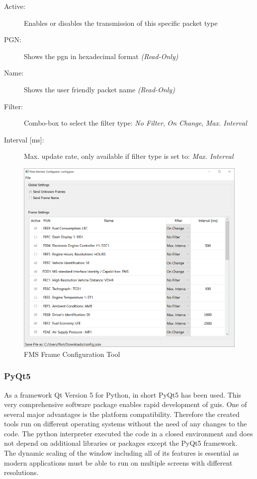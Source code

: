 \begin{description}
  \item[Active:] Enables or disables the transmission of this specific packet type
  \item[PGN:] Shows the \acrlong{pgn} in hexadecimal format \textit{(Read-Only)}
  \item[Name:] Shows the user friendly packet name \textit{(Read-Only)}
  \item[Filter:] Combo-box to select the filter type: \textit{No Filter}, \textit{On Change}, \textit{Max. Interval}
  \item[{Interval [ms]:}] Max. update rate, only available if filter type is set to: \textit{Max. Interval}
\end{description}

\medskip
\begin{figure}[h!]
	\centering
	\includegraphics[width=\textwidth]{images/Configuration-Tool_Screenshot}
	\caption{FMS Frame Configuration Tool}
	\label{fig:configuration_tool}
\end{figure}
\newpage

\subsubsection{PyQt5}
As a framework Qt Version 5 for Python, in short PyQt5 has been used. This very comprehensive software package enables rapid development of \acrshort{gui}s. One of several major advantages is the platform compatibility. Therefore the created tools run on different operating systems without the need of any changes to the code. The python interpreter executed the code in a closed environment and does not depend on additional libraries or packages except the PyQt5 framework. \\
The dynamic scaling of the window including all of its features is essential as modern applications must be able to run on multiple screens with different resolutions.

